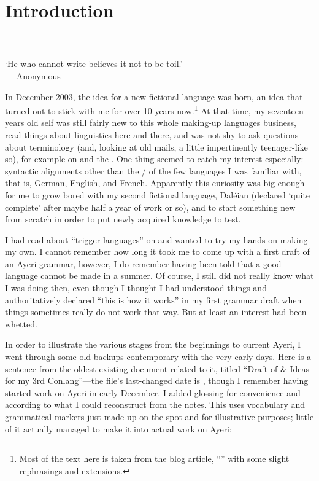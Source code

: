 
\setcounter{chapter}{-1}
\chapter{Introduction}

\begin{minipage}{\linewidth}\raggedleft\smaller
{}\\
\\
`He who cannot write believes it not to be toil.'\\
--- Anonymous
\end{minipage}\bigskip\bigskip

\noindent In December 2003, the idea for a new fictional language was born, an 
idea that turned out to stick with me for over 10 years now.\footnote{Most of 
the text here is taken from the blog article, 
``'' \parencite{benung:happybirthday} with some 
slight rephrasings and extensions.} At that time, my seventeen years old self 
was still fairly new to this whole making-up languages business, read things 
about linguistics here and there, and was not shy to ask questions about 
terminology (and, looking at old mails, a little impertinently teenager-like 
so), for example on  and the . One 
thing seemed to catch my interest especially: syntactic alignments other than 
the \Nom{}/\Acc{} of the few languages I was familiar with, that is, German, 
English, and French. Apparently this curiosity was big enough for me to grow 
bored with my second fictional language, Daléian (declared `quite complete' 
after maybe half a year of work or so), and to start something new from scratch 
in order to put newly acquired knowledge to test.

I had read about ``trigger languages'' on  and wanted to try my 
hands on making my own. I cannot remember how long it took me to come up with a 
first draft of an Ayeri grammar, however, I do remember having been told that a 
good language cannot be made in a summer. Of course, I still did not really 
know what I was doing then, even though I thought I had understood things and 
authoritatively declared ``this is how it works'' in my first grammar draft 
when things sometimes really do not work that way. But at least an interest had 
been whetted.

In order to illustrate the various stages from the beginnings to current Ayeri,
I went through some old backups contemporary with the very early days. 
Here is a sentence from the oldest existing document related to it, titled 
``Draft of \& Ideas for my 3rd Conlang''---the file's last-changed date is 
, though I remember having started work on Ayeri in early 
December. I added glossing for convenience and according to what I could 
reconstruct from the notes. This uses vocabulary and grammatical markers just 
made up on the spot and for illustrative purposes; little of it actually 
managed to make it into actual work on Ayeri:

